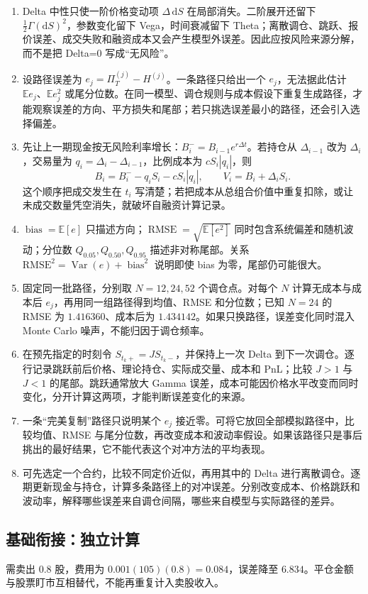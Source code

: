 
\begin{enumerate}[leftmargin=*]
  \item Delta 中性只使一阶价格变动项 $\Delta\,\mathrm dS$ 在局部消失。二阶展开还留下 $\frac12\Gamma(\mathrm dS)^2$，参数变化留下 Vega，时间衰减留下 Theta；离散调仓、跳跃、报价误差、成交失败和融资成本又会产生模型外误差。因此应按风险来源分解，而不是把 Delta=0 写成“无风险”。
  \item 设路径误差为 $e_j=\Pi_T^{(j)}-H^{(j)}$。一条路径只给出一个 $e_j$，无法据此估计 $\mathbb E e_j$、$\mathbb E e_j^2$ 或尾分位数。在同一模型、调仓规则与成本假设下重复生成路径，才能观察误差的方向、平方损失和尾部；若只挑选误差最小的路径，还会引入选择偏差。
  \item 先让上一期现金按无风险利率增长：$B_i^-=B_{i-1}e^{r\Delta t}$。若持仓从 $\Delta_{i-1}$ 改为 $\Delta_i$，交易量为 $q_i=\Delta_i-\Delta_{i-1}$，比例成本为 $cS_i|q_i|$，则
  \[
  B_i=B_i^- -q_iS_i-cS_i|q_i|,
  \qquad V_i=B_i+\Delta_iS_i.
  \]
  这个顺序把成交发生在 $t_i$ 写清楚；若把成本从总组合价值中重复扣除，或让未成交数量凭空消失，就破坏自融资计算记录。
  \item $\operatorname{bias}=\mathbb E[e]$ 只描述方向；$\operatorname{RMSE}=\sqrt{\mathbb E[e^2]}$ 同时包含系统偏差和随机波动；分位数 $Q_{0.05},Q_{0.50},Q_{0.95}$ 描述非对称尾部。关系 $\mathrm{RMSE}^2=\operatorname{Var}(e)+\operatorname{bias}^2$ 说明即使 bias 为零，尾部仍可能很大。
  \item 固定同一批路径，分别取 $N=12,24,52$ 个调仓点。对每个 $N$ 计算无成本与成本后 $e_j$，再用同一组路径得到均值、RMSE 和分位数；已知 $N=24$ 的 RMSE 为 $1.416360$、成本后为 $1.434142$。如果只换路径，误差变化同时混入 Monte Carlo 噪声，不能归因于调仓频率。
  \item 在预先指定的时刻令 $S_{t_k+}=J S_{t_k-}$，并保持上一次 Delta 到下一次调仓。逐行记录跳跃前后价格、理论持仓、实际成交量、成本和 PnL；比较 $J>1$ 与 $J<1$ 的尾部。跳跃通常放大 Gamma 误差，成本可能因价格水平改变而同时变化，分开计算这两项，才能判断误差变化的来源。
  \item 一条“完美复制”路径只说明某个 $e_j$ 接近零。可将它放回全部模拟路径中，比较均值、RMSE 与尾分位数，再改变成本和波动率假设。如果该路径只是事后挑出的最好结果，它不能代表这个对冲方法的平均表现。
  \item 可先选定一个合约，比较不同定价近似，再用其中的 Delta 进行离散调仓。逐期更新现金与持仓，计算多条路径上的对冲误差。分别改变成本、价格跳跃和波动率，解释哪些误差来自调仓间隔，哪些来自模型与实际路径的差异。
\end{enumerate}

\subsection*{基础衔接：独立计算}
需卖出 0.8 股，费用为 $0.001(105)(0.8)=0.084$，误差降至 $6.834$。平仓金额与股票盯市互相替代，不能再重复计入卖股收入。
